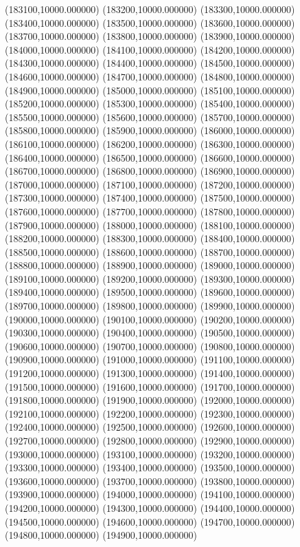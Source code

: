 (183100,10000.000000)
(183200,10000.000000)
(183300,10000.000000)
(183400,10000.000000)
(183500,10000.000000)
(183600,10000.000000)
(183700,10000.000000)
(183800,10000.000000)
(183900,10000.000000)
(184000,10000.000000)
(184100,10000.000000)
(184200,10000.000000)
(184300,10000.000000)
(184400,10000.000000)
(184500,10000.000000)
(184600,10000.000000)
(184700,10000.000000)
(184800,10000.000000)
(184900,10000.000000)
(185000,10000.000000)
(185100,10000.000000)
(185200,10000.000000)
(185300,10000.000000)
(185400,10000.000000)
(185500,10000.000000)
(185600,10000.000000)
(185700,10000.000000)
(185800,10000.000000)
(185900,10000.000000)
(186000,10000.000000)
(186100,10000.000000)
(186200,10000.000000)
(186300,10000.000000)
(186400,10000.000000)
(186500,10000.000000)
(186600,10000.000000)
(186700,10000.000000)
(186800,10000.000000)
(186900,10000.000000)
(187000,10000.000000)
(187100,10000.000000)
(187200,10000.000000)
(187300,10000.000000)
(187400,10000.000000)
(187500,10000.000000)
(187600,10000.000000)
(187700,10000.000000)
(187800,10000.000000)
(187900,10000.000000)
(188000,10000.000000)
(188100,10000.000000)
(188200,10000.000000)
(188300,10000.000000)
(188400,10000.000000)
(188500,10000.000000)
(188600,10000.000000)
(188700,10000.000000)
(188800,10000.000000)
(188900,10000.000000)
(189000,10000.000000)
(189100,10000.000000)
(189200,10000.000000)
(189300,10000.000000)
(189400,10000.000000)
(189500,10000.000000)
(189600,10000.000000)
(189700,10000.000000)
(189800,10000.000000)
(189900,10000.000000)
(190000,10000.000000)
(190100,10000.000000)
(190200,10000.000000)
(190300,10000.000000)
(190400,10000.000000)
(190500,10000.000000)
(190600,10000.000000)
(190700,10000.000000)
(190800,10000.000000)
(190900,10000.000000)
(191000,10000.000000)
(191100,10000.000000)
(191200,10000.000000)
(191300,10000.000000)
(191400,10000.000000)
(191500,10000.000000)
(191600,10000.000000)
(191700,10000.000000)
(191800,10000.000000)
(191900,10000.000000)
(192000,10000.000000)
(192100,10000.000000)
(192200,10000.000000)
(192300,10000.000000)
(192400,10000.000000)
(192500,10000.000000)
(192600,10000.000000)
(192700,10000.000000)
(192800,10000.000000)
(192900,10000.000000)
(193000,10000.000000)
(193100,10000.000000)
(193200,10000.000000)
(193300,10000.000000)
(193400,10000.000000)
(193500,10000.000000)
(193600,10000.000000)
(193700,10000.000000)
(193800,10000.000000)
(193900,10000.000000)
(194000,10000.000000)
(194100,10000.000000)
(194200,10000.000000)
(194300,10000.000000)
(194400,10000.000000)
(194500,10000.000000)
(194600,10000.000000)
(194700,10000.000000)
(194800,10000.000000)
(194900,10000.000000)
